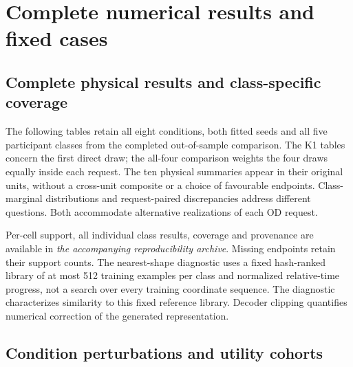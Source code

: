 \chapter{Complete numerical results and fixed cases}
\label{app:native-results}

\section{Complete physical results and class-specific coverage}
The following tables retain all eight conditions, both fitted seeds and all five participant classes from the completed out-of-sample comparison. The K1 tables concern the first direct draw; the all-four comparison weights the four draws equally inside each request. The ten physical summaries appear in their original units, without a cross-unit composite or a choice of favourable endpoints. Class-marginal distributions and request-paired discrepancies address different questions. Both accommodate alternative realizations of each OD request.


\FloatBarrier

\FloatBarrier


\FloatBarrier


\FloatBarrier


\FloatBarrier

\FloatBarrier

Per-cell support, all individual class results, coverage and provenance are available in \textit{the accompanying reproducibility archive}. Missing endpoints retain their support counts. The nearest-shape diagnostic uses a fixed hash-ranked library of at most 512 training examples per class and normalized relative-time progress, not a search over every training coordinate sequence. The diagnostic characterizes similarity to this fixed reference library. Decoder clipping quantifies numerical correction of the generated representation.


\section{Condition perturbations and utility cohorts}

\FloatBarrier

\FloatBarrier

\FloatBarrier
